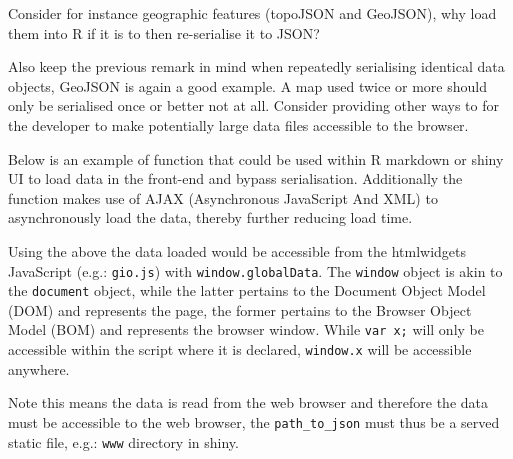 \documentclass[
]{krantz}
\makeatletter
\newenvironment{Shaded}{\begin{snugshade}}{\end{snugshade}}
\newcommand{\CommentTok}[1]{\textcolor[rgb]{0.37,0.37,0.37}{\textit{#1}}}
\newcommand{\ControlFlowTok}[1]{\textcolor[rgb]{0.27,0.27,0.27}{\textbf{#1}}}
\newcommand{\KeywordTok}[1]{\textcolor[rgb]{0.27,0.27,0.27}{\textbf{#1}}}
\newcommand{\NormalTok}[1]{#1}
\newcommand{\OperatorTok}[1]{\textcolor[rgb]{0.43,0.43,0.43}{\textbf{#1}}}
\newcommand{\StringTok}[1]{\textcolor[rgb]{0.5,0.5,0.5}{#1}}
\newenvironment{kframe}{%
\medskip{}
\setlength{\fboxsep}{.8em}
 \def\at@end@of@kframe{}%
 \ifinner\ifhmode%
  \def\at@end@of@kframe{\end{minipage}}%
  \begin{minipage}{\columnwidth}%
 \fi\fi%
 \def\FrameCommand##1{\hskip\@totalleftmargin \hskip-\fboxsep
 \colorbox{shadecolor}{##1}\hskip-\fboxsep
     \hskip-\linewidth \hskip-\@totalleftmargin \hskip\columnwidth}%
 \MakeFramed {\advance\hsize-\width
   \@totalleftmargin\z@ \linewidth\hsize
   \@setminipage}}%
 {\par\unskip\endMakeFramed%
 \at@end@of@kframe}
\renewenvironment{Shaded}{\begin{kframe}}{\end{kframe}}
\makeatother
\begin{document}
Consider for instance geographic features (topoJSON and GeoJSON), why load them into R if it is to then re-serialise it to JSON?

Also keep the previous remark in mind when repeatedly serialising identical data objects, GeoJSON is again a good example. A map used twice or more should only be serialised once or better not at all. Consider providing other ways to for the developer to make potentially large data files accessible to the browser.

Below is an example of function that could be used within R markdown or shiny UI to load data in the front-end and bypass serialisation. Additionally the function makes use of AJAX (Asynchronous JavaScript And XML) to asynchronously load the data, thereby further reducing load time.

\begin{Shaded}
\end{Shaded}

Using the above the data loaded would be accessible from the htmlwidgets JavaScript (e.g.: \texttt{gio.js}) with \texttt{window.globalData}. The \texttt{window} object is akin to the \texttt{document} object, while the latter pertains to the Document Object Model (DOM) and represents the page, the former pertains to the Browser Object Model (BOM) and represents the browser window. While \texttt{var\ x;} will only be accessible within the script where it is declared, \texttt{window.x} will be accessible anywhere.

Note this means the data is read from the web browser and therefore the data must be accessible to the web browser, the \texttt{path\_to\_json} must thus be a served static file, e.g.: \texttt{www} directory in shiny.
\end{document}
